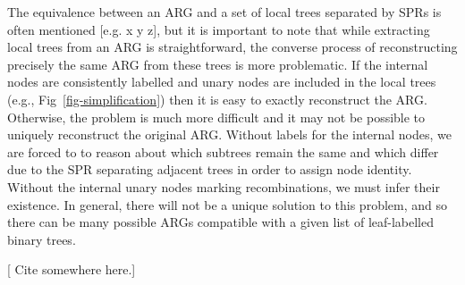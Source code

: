 \documentclass{article}
\begin{document}
The equivalence between an ARG and a set of local trees
separated by SPRs is often mentioned [e.g. x y z], but
it is important to note that while extracting local
trees from an ARG is straightforward, the converse
process of reconstructing precisely the same ARG from
these trees is more problematic. If the internal
nodes are consistently labelled and unary nodes are
included in the local trees (e.g., Fig~\ref{fig-simplification})
then it is easy to exactly reconstruct the ARG.
Otherwise, the problem is much more difficult and it
may not be possible to uniquely reconstruct the original ARG.
Without labels for the internal nodes, we are forced to
to reason about which subtrees remain the same and which
differ due to the SPR separating adjacent trees in order to
assign node identity. Without the internal unary nodes marking
recombinations, we must infer their existence. In
general, there will not be a unique solution to this problem,
and so there can be many possible ARGs compatible with
a given list of
leaf-labelled binary trees.

[ Cite \citep{deng2021distribution} somewhere here.]

\end{document}

